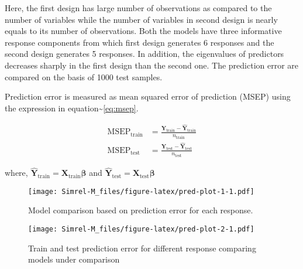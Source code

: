 \documentclass[12pt,a4paperpaper,authoryear]{elsarticle} %
\makeatletter
\def\maxwidth{\ifdim\Gin@nat@width>\linewidth\linewidth
\else\Gin@nat@width\fi}
\let\Oldincludegraphics\includegraphics
\renewcommand{\includegraphics}[1]{\Oldincludegraphics[width=\maxwidth]{#1}}
\makeatother
\begin{document}
Here, the first design has large number of observations as compared to
the number of variables while the number of variables in second design
is nearly equals to its number of observations. Both the models have
three informative response components from which first design generates
6 responses and the second design generates 5 responses. In addition,
the eigenvalues of predictors decreases sharply in the first design than
the second one. The prediction error are compared on the basis of 1000
test samples.

Prediction error is measured as mean squared error of prediction (MSEP)
using the expression in equation\textasciitilde{}\eqref{eq:msep}.

\begin{align}
  \text{MSEP}_\text{train} &= \frac{\mathbf{Y}_\text{train} - 
    \hat{\mathbf{Y}}_\text{train}}{n_\text{train}} \nonumber \\
  \text{MSEP}_\text{test}  &= \frac{\mathbf{Y}_\text{test} - 
    \hat{\mathbf{Y}}_\text{test}}{n_\text{test}}
  \label{eq:msep}
\end{align}

where,
\(\hat{\mathbf{Y}}_\text{train} = \mathbf{X}_\text{train} \boldsymbol{\beta}\)
and
\(\hat{\mathbf{Y}}_\text{test} = \mathbf{X}_\text{test} \boldsymbol{\beta}\)

\begin{figure}
\centering
\texttt{[image: Simrel-M\_files/figure-latex/pred-plot-1-1.pdf]}
\caption{\label{fig:pred-plot-1}Model comparison based on prediction error
for each response.}
\end{figure}

\begin{figure}
\centering
\texttt{[image: Simrel-M\_files/figure-latex/pred-plot-2-1.pdf]}
\caption{\label{fig:pred-plot-2}Train and test prediction error for
different response comparing models under comparison}
\end{figure}

\renewcommand\refname{References}

\end{document}

